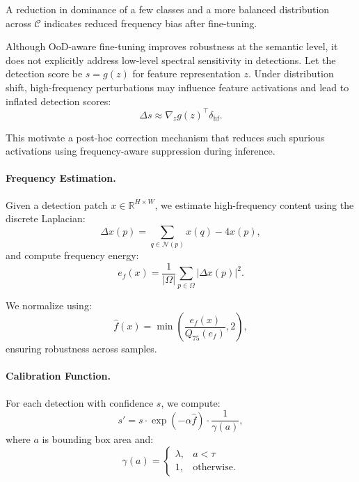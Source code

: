 A reduction in dominance of a few classes and a more balanced distribution across $\mathcal{C}$ indicates reduced frequency bias after fine-tuning.

\vspace{0.5em}
Although OoD-aware fine-tuning improves robustness at the semantic level, it does not explicitly address low-level spectral sensitivity in detections. Let the detection score be $s = g(z)$ for feature representation $z$. Under distribution shift, high-frequency perturbations may influence feature activations and lead to inflated detection scores:
\begin{equation}
    \Delta s \approx \nabla_z g(z)^\top \delta_{\mathrm{hf}}.
\end{equation}

This motivate a post-hoc correction mechanism that reduces such spurious activations using frequency-aware suppression during inference.

\paragraph{Frequency Estimation.}
Given a detection patch $x \in \mathbb{R}^{H\times W}$, we estimate high-frequency content using the discrete Laplacian:
\begin{equation}
    \Delta x(p) = \sum_{q \in \mathcal{N}(p)} x(q) - 4x(p),
\end{equation}
and compute frequency energy:
\begin{equation}
    e_f(x) = \frac{1}{|\Omega|} \sum_{p\in\Omega} |\Delta x(p)|^2.
\end{equation}

We normalize using:
\begin{equation}
    \hat{f}(x) = \min\!\left(\frac{e_f(x)}{Q_{75}(e_f)}, 2\right),
\end{equation}
ensuring robustness across samples.

\paragraph{Calibration Function.}
For each detection with confidence $s$, we compute:
\begin{equation}
    s' = s \cdot \exp(-\alpha \hat{f}) \cdot \frac{1}{\gamma(a)},
\end{equation}
where $a$ is bounding box area and:
\begin{equation}
    \gamma(a) =
    \begin{cases}
        \lambda, & a < \tau \\
        1, & \text{otherwise}.
    \end{cases}
\end{equation}

